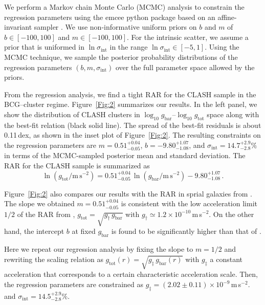 \documentclass[a4paper,iop,twocolumn,twocolappendix,numberedappendix,appendixfloats]{emulateapj}
\newcommand{\percent}{\ensuremath{\%}}
\newcommand{\gbar}{g_\mathrm{bar}}
\newcommand{\gtot}{g_\mathrm{tot}}
\begin{document}
We perform a Markov chain Monte Carlo (MCMC) analysis to constrain the
regression parameters using the emcee python package
\citep{Foreman-Mackey13,emcee2019}
based on an affine-invariant sampler \citep{GW10}.
We use non-informative uniform priors on $b$ and $m$ of
$b\in [-100, 100]$ and $m\in [-100, 100]$. For the intrinsic scatter, we assume
a prior that is uniformed in $\ln{\sigma_\mathrm{int}}$ in the range
$\ln{\sigma_\mathrm{int}}\in [-5,1]$.
Using the MCMC technique,
we sample the posterior probability distributions of the regression
parameters $(b,m,\sigma_\mathrm{int})$ over the full parameter space
allowed by the priors.

From the regression analysis, we find a tight RAR for the CLASH sample
in the BCG--cluster regime.
Figure~\ref{Fig:2} summarizes our results.
In the left panel, we show the distribution of CLASH
clusters in $\log_{10}{\gbar}$--$\log_{10}{\gtot}$ space along with the
best-fit relation (black solid line).
The spread of the best-fit residuals is about 0.11\,dex, as shown in the
inset plot of Figure~\ref{Fig:2}.
The resulting constraints on the regression parameters are
$m=0.51^{+0.04}_{-0.05}$,
$b=-9.80^{+1.07}_{-1.08}$, and
$\sigma_\mathrm{int}=14.7^{+2.9}_{-2.8}\percent$ in terms of the
MCMC-sampled posterior mean and standard deviation.
The RAR for the CLASH sample is summarized as
\begin{equation}
 \label{eq:RAR}
 \ln(\gtot/\mathrm{m}\,\mathrm{s}^{-2})=0.51^{+0.04}_{-0.05}\,\ln(\gbar/\mathrm{m}\,\mathrm{s}^{-2})-9.80^{+1.07}_{-1.08}\,.
\end{equation}

Figure~\ref{Fig:2} also compares our results with the RAR in sprial
galaxies from \citet[][dashed line]{McGaugh16}.
The slope we obtained $m=0.51^{+0.04}_{-0.05}$ is consistent with
the low acceleration limit $1/2$ of the RAR from \citet{McGaugh16},
 $\gtot =\sqrt{g_\dag\, \gbar}$ with
 $g_\dag\simeq 1.2\times 10^{-10}$\,m\,s$^{-2}$.
On the other hand,
 the intercept
$b$ at fixed $\gbar$ is found to be significantly
 higher than that of \citet{McGaugh16}.

Here we repeat our regression analysis by fixing the slope to $m=1/2$
and rewriting the scaling relation as
$\gtot(r)=\sqrt{g_\ddag\,\gbar(r)}$ with $g_\ddag$ a constant
acceleration that corresponds to a certain characteristic acceleration
scale.
Then, the regression parameters are constrained as
 $g_\ddag = (2.02\pm0.11)\times 10^{-9}$\,m\,s$^{-2}$.
 and
 $\sigma_\mathrm{int}= 14.5^{+2.9}_{-2.8}\percent$.
\end{document}
